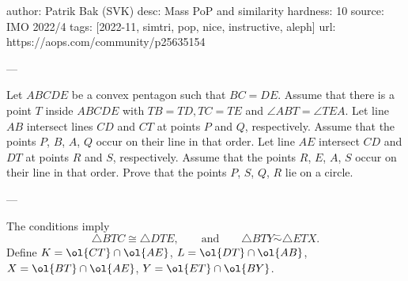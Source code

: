 author: Patrik Bak (SVK)
desc: Mass PoP and similarity
hardness: 10
source: IMO 2022/4
tags: [2022-11, simtri, pop, nice, instructive, aleph]
url: https://aops.com/community/p25635154

---

Let $ABCDE$ be a convex pentagon such that $BC=DE$.
Assume that there is a point $T$ inside $ABCDE$ with $TB=TD,TC=TE$ and $\angle ABT = \angle TEA$.
Let line $AB$ intersect lines $CD$ and $CT$ at points $P$ and $Q$, respectively.
Assume that the points $P$, $B$, $A$, $Q$ occur on their line in that order.
Let line $AE$ intersect $CD$ and $DT$ at points $R$ and $S$, respectively.
Assume that the points $R$, $E$, $A$, $S$ occur on their line in that order.
Prove that the points $P$, $S$, $Q$, $R$ lie on a circle.

---

The conditions imply
\[ \triangle BTC \cong \triangle DTE,
  \qquad\text{and}\qquad
  \triangle BTY \overset{-}{\sim} \triangle ETX. \]
Define $K = \ol{CT} \cap \ol{AE}$, $L = \ol{DT} \cap \ol{AB}$,
$X = \ol{BT} \cap \ol{AE}$, $Y = \ol{ET} \cap \ol{BY}$.

